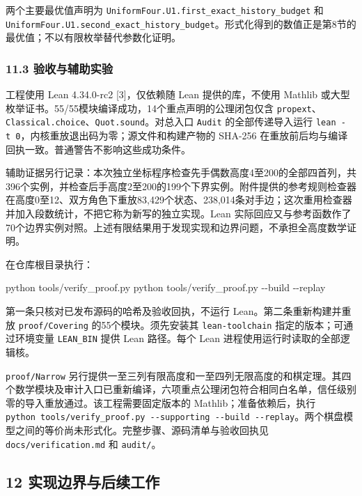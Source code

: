 \documentclass[
  a4paper,
]{article}
\newenvironment{Shaded}{}{}
\newcommand{\AttributeTok}[1]{\textcolor[rgb]{0.49,0.56,0.16}{#1}}
\newcommand{\ExtensionTok}[1]{#1}
\newcommand{\NormalTok}[1]{#1}
\begin{document}
两个主要最优值声明为
\texttt{UniformFour.U1.first\_exact\_history\_budget} 和
\texttt{UniformFour.U1.second\_exact\_history\_budget}。形式化得到的数值正是第8节的最优值；不以有限枚举替代参数化证明。

\subsubsection{11.3
验收与辅助实验}\label{ux9a8cux6536ux4e0eux8f85ux52a9ux5b9eux9a8c}

工程使用 Lean 4.34.0-rc2 {[}3{]}，仅依赖随 Lean 提供的库，不使用 Mathlib
或大型枚举证书。55/55模块编译成功，14个重点声明的公理闭包仅含
\texttt{propext}、\texttt{Classical.choice}、\texttt{Quot.sound}。对总入口
\texttt{Audit} 的全部传递导入运行
\texttt{lean\ -t\ 0}，内核重放退出码为零；源文件和构建产物的 SHA-256
在重放前后均与编译回执一致。普通警告不影响这些成功条件。

辅助证据另行记录：本次独立坐标程序检查先手偶数高度4至200的全部四首列，共396个实例，并检查后手高度2至200的199个下界实例。附件提供的参考规则检查器在高度0至12、双方角色下重放83,429个状态、238,014条对手边；这次重用检查器并加入段数统计，不把它称为新写的独立实现。Lean
实际回应又与参考函数作了70个边界实例对照。上述有限结果用于发现实现和边界问题，不承担全高度数学证明。

在仓库根目录执行：

\begin{Shaded}
\begin{Highlighting}[]
\ExtensionTok{python}\NormalTok{ tools/verify\_proof.py}
\ExtensionTok{python}\NormalTok{ tools/verify\_proof.py }\AttributeTok{{-}{-}build} \AttributeTok{{-}{-}replay}
\end{Highlighting}
\end{Shaded}

第一条只核对已发布源码的哈希及验收回执，不运行
Lean。第二条重新构建并重放 \texttt{proof/Covering}
的55个模块。须先安装其 \texttt{lean-toolchain}
指定的版本；可通过环境变量 \texttt{LEAN\_BIN} 提供 Lean 路径。每个 Lean
进程使用运行时读取的全部逻辑核。

\texttt{proof/Narrow}
另行提供一至三列有限高度和一至四列无限高度的和棋定理。其四个数学模块及审计入口已重新编译，六项重点公理闭包符合相同白名单，信任级别零的导入重放通过。该工程需要固定版本的
Mathlib；准备依赖后，执行
\texttt{python\ tools/verify\_proof.py\ -\/-supporting\ -\/-build\ -\/-replay}。两个棋盘模型之间的等价尚未形式化。完整步骤、源码清单与验收回执见
\texttt{docs/verification.md} 和 \texttt{audit/}。

\subsection{12
实现边界与后续工作}\label{ux5b9eux73b0ux8fb9ux754cux4e0eux540eux7eedux5de5ux4f5c}
\end{document}
